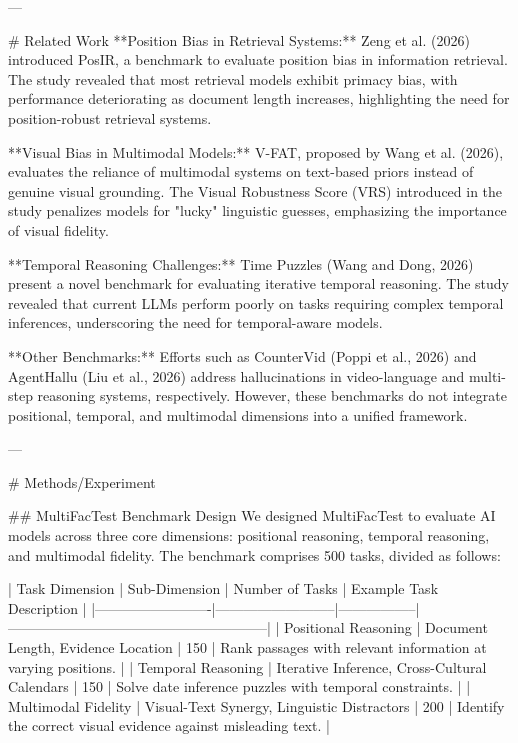 ---

# Related Work  
**Position Bias in Retrieval Systems:**  
Zeng et al. (2026) introduced PosIR, a benchmark to evaluate position bias in information retrieval. The study revealed that most retrieval models exhibit primacy bias, with performance deteriorating as document length increases, highlighting the need for position-robust retrieval systems.

**Visual Bias in Multimodal Models:**  
V-FAT, proposed by Wang et al. (2026), evaluates the reliance of multimodal systems on text-based priors instead of genuine visual grounding. The Visual Robustness Score (VRS) introduced in the study penalizes models for "lucky" linguistic guesses, emphasizing the importance of visual fidelity.

**Temporal Reasoning Challenges:**  
Time Puzzles (Wang and Dong, 2026) present a novel benchmark for evaluating iterative temporal reasoning. The study revealed that current LLMs perform poorly on tasks requiring complex temporal inferences, underscoring the need for temporal-aware models.

**Other Benchmarks:**  
Efforts such as CounterVid (Poppi et al., 2026) and AgentHallu (Liu et al., 2026) address hallucinations in video-language and multi-step reasoning systems, respectively. However, these benchmarks do not integrate positional, temporal, and multimodal dimensions into a unified framework.

---

# Methods/Experiment  

## MultiFacTest Benchmark Design  
We designed MultiFacTest to evaluate AI models across three core dimensions: positional reasoning, temporal reasoning, and multimodal fidelity. The benchmark comprises 500 tasks, divided as follows:

| Task Dimension         | Sub-Dimension            | Number of Tasks | Example Task Description                                 |
|-------------------------|--------------------------|-----------------|--------------------------------------------------------|
| Positional Reasoning    | Document Length, Evidence Location | 150             | Rank passages with relevant information at varying positions. |
| Temporal Reasoning      | Iterative Inference, Cross-Cultural Calendars | 150             | Solve date inference puzzles with temporal constraints. |
| Multimodal Fidelity     | Visual-Text Synergy, Linguistic Distractors | 200             | Identify the correct visual evidence against misleading text. |

